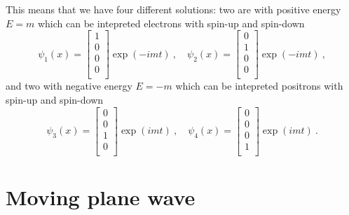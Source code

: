 \begin{example}
        This means that we have four different solutions: two are with positive energy $E = m$ which can be intepreted electrons with spin-up and spin-down
        \begin{equation*}
            \psi_1(x) = \begin{bmatrix}
                1 \\ 0 \\ 0 \\ 0 \\
            \end{bmatrix} \exp(-imt) ~, \quad \psi_2(x) = \begin{bmatrix}
                0 \\ 1 \\ 0 \\ 0 \\
            \end{bmatrix} \exp(-imt) ~,
        \end{equation*}
        and two with negative energy $E = - m$ which can be intepreted positrons with spin-up and spin-down
        \begin{equation*}
            \psi_3(x) = \begin{bmatrix}
                0 \\ 0 \\ 1 \\ 0 \\
            \end{bmatrix} \exp(imt) ~, \quad \psi_4(x) = \begin{bmatrix}
                0 \\ 0 \\ 0 \\ 1 \\
            \end{bmatrix} \exp(imt) ~.
        \end{equation*}
    \end{example}

\section{Moving plane wave}

